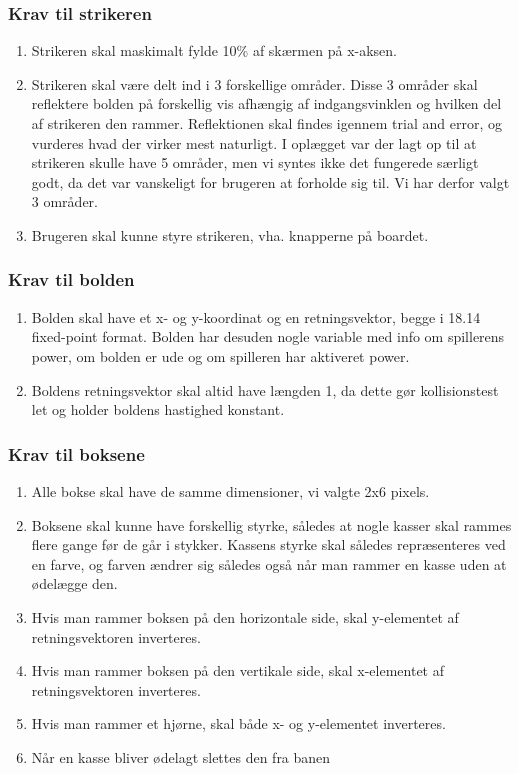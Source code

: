 \subsubsection{Krav til strikeren}
\begin{enumerate}
\item Strikeren skal maskimalt fylde 10\% af skærmen på x-aksen. 
\item  Strikeren skal være delt ind i 3 forskellige områder. Disse 3 områder skal reflektere bolden på forskellig vis afhængig af indgangsvinklen og hvilken del af strikeren den rammer. Reflektionen skal findes igennem trial and error, og vurderes hvad der virker mest naturligt. I oplægget var der lagt op til at strikeren skulle have 5 områder, men vi syntes ikke det fungerede særligt godt, da det var vanskeligt for brugeren at forholde sig til. Vi har derfor valgt 3 områder.
\item Brugeren skal kunne styre strikeren, vha. knapperne på boardet.
\end{enumerate}
\subsubsection{Krav til bolden}
\label{Ballkrav}
\begin{enumerate}
\item Bolden skal have et x- og y-koordinat og en retningsvektor, begge i 18.14 fixed-point format. Bolden har desuden nogle variable med info om spillerens power, om bolden er ude og om spilleren har aktiveret power.
\item Boldens retningsvektor skal altid have længden 1, da dette gør kollisionstest let og holder boldens hastighed konstant.

\end{enumerate}
\subsubsection{Krav til boksene}
\begin{enumerate}
\item Alle bokse skal have de samme dimensioner, vi valgte 2x6 pixels.
\item Boksene skal kunne have forskellig styrke, således at nogle kasser skal rammes flere gange før de går i stykker. Kassens styrke skal således repræsenteres ved en farve, og farven ændrer sig således også når man rammer en kasse uden at ødelægge den.
\item Hvis man rammer boksen på den horizontale side, skal y-elementet af retningsvektoren inverteres. 
\item Hvis man rammer boksen på den vertikale side, skal x-elementet af retningsvektoren inverteres.
\item Hvis man rammer et hjørne, skal både x- og y-elementet inverteres.
\item Når en kasse bliver ødelagt slettes den fra banen
\end{enumerate}



